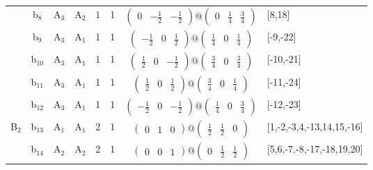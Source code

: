 \documentclass[fleqn,10pt,landscape]{article}
\begin{document}
\begin{itemize}
\begin{center}
\begin{longtable}{cc|cc|c|c|c|l}
& b$_{8}$ & A$_{3}$ & A$_{2}$ & 1 & 1 & $\begin{pmatrix} 0 & - \frac{1}{2} & - \frac{1}{2} \end{pmatrix}@\begin{pmatrix} 0 & \frac{1}{4} & \frac{3}{4} \end{pmatrix}$ & [8,18] \\
& b$_{9}$ & A$_{3}$ & A$_{1}$ & 1 & 1 & $\begin{pmatrix} - \frac{1}{2} & 0 & \frac{1}{2} \end{pmatrix}@\begin{pmatrix} \frac{1}{4} & 0 & \frac{1}{4} \end{pmatrix}$ & [-9,-22] \\
& b$_{10}$ & A$_{3}$ & A$_{1}$ & 1 & 1 & $\begin{pmatrix} \frac{1}{2} & 0 & - \frac{1}{2} \end{pmatrix}@\begin{pmatrix} \frac{3}{4} & 0 & \frac{3}{4} \end{pmatrix}$ & [-10,-21] \\
& b$_{11}$ & A$_{3}$ & A$_{1}$ & 1 & 1 & $\begin{pmatrix} \frac{1}{2} & 0 & \frac{1}{2} \end{pmatrix}@\begin{pmatrix} \frac{3}{4} & 0 & \frac{1}{4} \end{pmatrix}$ & [-11,-24] \\
& b$_{12}$ & A$_{3}$ & A$_{1}$ & 1 & 1 & $\begin{pmatrix} - \frac{1}{2} & 0 & - \frac{1}{2} \end{pmatrix}@\begin{pmatrix} \frac{1}{4} & 0 & \frac{3}{4} \end{pmatrix}$ & [-12,-23] \\ \hline
B$_{2}$ & b$_{13}$ & A$_{1}$ & A$_{1}$ & 2 & 1 & $\begin{pmatrix} 0 & 1 & 0 \end{pmatrix}@\begin{pmatrix} \frac{1}{2} & \frac{1}{2} & 0 \end{pmatrix}$ & [1,-2,-3,4,-13,14,15,-16] \\
& b$_{14}$ & A$_{2}$ & A$_{2}$ & 2 & 1 & $\begin{pmatrix} 0 & 0 & 1 \end{pmatrix}@\begin{pmatrix} 0 & \frac{1}{2} & \frac{1}{2} \end{pmatrix}$ & [5,6,-7,-8,-17,-18,19,20] \\

\end{longtable}
\end{center}
\end{itemize}
\end{document}
